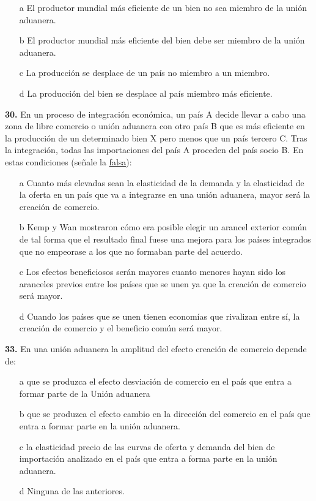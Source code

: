 \documentclass{nuevotema}
\begin{document}
\begin{itemize}
	\item[a] El productor mundial más eficiente de un bien no sea miembro de la unión aduanera.
	\item[b] El productor mundial más eficiente del bien debe ser miembro de la unión aduanera.
	\item[c] La producción se desplace de un país no miembro a un miembro.
	\item[d] La producción del bien se desplace al país miembro más eficiente.
\end{itemize}

\textbf{30.} En un proceso de integración económica, un país A decide llevar a cabo una zona de libre comercio o unión aduanera con otro país B que es más eficiente en la producción de un determinado bien X pero menos que un país tercero C. Tras la integración, todas las importaciones del país A proceden del país socio B. En estas condiciones (señale la \underline{falsa}):

\begin{itemize}
	\item[a] Cuanto más elevadas sean la elasticidad de la demanda y la elasticidad de la oferta en un país que va a integrarse en una unión aduanera, mayor será la creación de comercio. 
	\item[b] Kemp y Wan mostraron cómo era posible elegir un arancel exterior común de tal forma que el resultado final fuese una mejora para los países integrados que no empeorase a los que no formaban parte del acuerdo.
	\item[c] Los efectos beneficiosos serán mayores cuanto menores hayan sido los aranceles previos entre los países que se unen ya que la creación de comercio será mayor.
	\item[d] Cuando los países que se unen tienen economías que rivalizan entre sí, la creación de comercio y el beneficio común será mayor.
\end{itemize}

\textbf{33.} En una unión aduanera la amplitud del efecto creación de comercio depende de:

\begin{itemize}
	\item[a] que se produzca el efecto desviación de comercio en el país que entra a formar parte de la Unión aduanera
	\item[b] que se produzca el efecto cambio en la dirección del comercio en el país que entra a formar parte en la unión aduanera.
	\item[c] la elasticidad precio de las curvas de oferta y demanda del bien de importación analizado en el país que entra a forma parte en la unión aduanera.
	\item[d] Ninguna de las anteriores.
\end{itemize}
\end{document}
